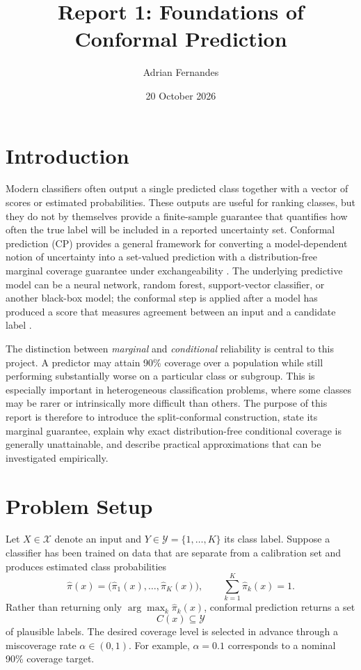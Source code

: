 \documentclass[12pt,a4paper]{article}
\title{Report 1: Foundations of Conformal Prediction}
\author{Adrian Fernandes}
\date{20 October 2026}
\begin{document}
\maketitle

\section{Introduction}

Modern classifiers often output a single predicted class together with a vector of scores or estimated probabilities. These outputs are useful for ranking classes, but they do not by themselves provide a finite-sample guarantee that quantifies how often the true label will be included in a reported uncertainty set. Conformal prediction (CP) provides a general framework for converting a model-dependent notion of uncertainty into a set-valued prediction with a distribution-free marginal coverage guarantee under exchangeability \cite{angelopoulos2023gentle}. The underlying predictive model can be a neural network, random forest, support-vector classifier, or another black-box model; the conformal step is applied after a model has produced a score that measures agreement between an input and a candidate label \cite{romano2020classification}.

The distinction between \emph{marginal} and \emph{conditional} reliability is central to this project. A predictor may attain 90\% coverage over a population while still performing substantially worse on a particular class or subgroup. This is especially important in heterogeneous classification problems, where some classes may be rarer or intrinsically more difficult than others. The purpose of this report is therefore to introduce the split-conformal construction, state its marginal guarantee, explain why exact distribution-free conditional coverage is generally unattainable, and describe practical approximations that can be investigated empirically.

\section{Problem Setup}

Let $X \in \mathcal{X}$ denote an input and $Y \in \mathcal{Y}=\{1,\ldots,K\}$ its class label. Suppose a classifier has been trained on data that are separate from a calibration set and produces estimated class probabilities
\[
\hat{\pi}(x) = \bigl(\hat{\pi}_1(x),\ldots,\hat{\pi}_K(x)\bigr),
\qquad \sum_{k=1}^{K}\hat{\pi}_k(x)=1.
\]
Rather than returning only $\arg\max_k \hat{\pi}_k(x)$, conformal prediction returns a set
\[
C(x) \subseteq \mathcal{Y}
\]
of plausible labels. The desired coverage level is selected in advance through a miscoverage rate $\alpha\in(0,1)$. For example, $\alpha=0.1$ corresponds to a nominal 90\% coverage target.
\end{document}
